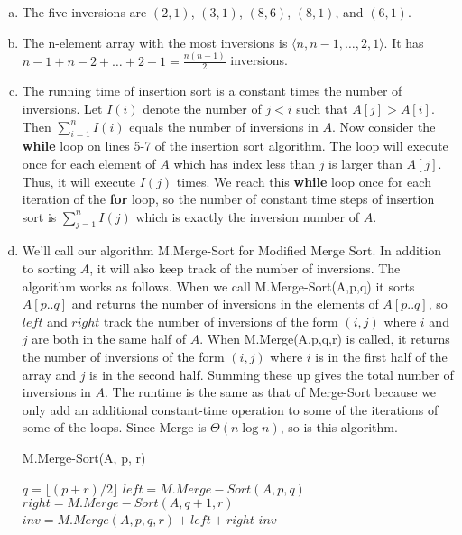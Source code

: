 \documentclass{article}
\begin{document}
\begin{enumerate}[a.]
\item The five inversions are $(2,1)$, $(3,1)$, $(8,6)$, $(8,1)$, and $(6,1)$. \\

\item The n-element array with the most inversions is $\langle n, n-1, \ldots, 2, 1 \rangle$.  It has $n-1 + n-2 + \ldots + 2 + 1 = \frac{n(n-1)}{2}$ inversions. \\

\item The running time of insertion sort is a constant times the number of inversions.  Let $I(i)$ denote the number of $j < i$ such that $A[j] > A[i]$.  Then $\sum_{i=1}^n I(i)$ equals the number of inversions in $A$.  Now consider the \textbf{while} loop on lines 5-7 of the insertion sort algorithm.  The loop will execute once for each element of $A$ which has index less than $j$ is larger than $A[j]$.  Thus, it will execute $I(j)$ times.  We reach this \textbf{while} loop once for each iteration of the \textbf{for} loop, so the number of constant time steps of insertion sort is $\sum_{j=1}^n I(j)$ which is exactly the inversion number of $A$.  \\

\item We'll call our algorithm M.Merge-Sort for Modified Merge Sort.  In addition to sorting $A$, it will also keep track of the number of inversions.  The algorithm works as follows.  When we call M.Merge-Sort(A,p,q) it sorts $A[p..q]$ and returns the number of inversions in the elements of $A[p..q]$, so $left$ and $right$ track the number of inversions of the form $(i,j)$ where $i$ and $j$ are both in the same half of $A$.  When M.Merge(A,p,q,r) is called, it returns the number of inversions of the form $(i,j)$ where $i$ is in the first half of the array and $j$ is in the second half.  Summing these up gives the total number of inversions in $A$.  The runtime is the same as that of Merge-Sort because we only add an additional constant-time operation to some of the iterations of some of the loops.  Since Merge is $\Theta(n \log n)$, so is this algorithm.

\begin{algorithm}
\caption{M.Merge-Sort(A, p, r)}
\begin{algorithmic}
	\State $q = \lfloor(p+r)/2\rfloor$
	\State $left = M.Merge-Sort(A,p,q)$
	\State $right = M.Merge-Sort(A,q+1,r)$
	\State $inv = M.Merge(A,p,q,r) + left + right$
	\State \Return $inv$
\EndIf
\State {}
\end{algorithmic}
\end{algorithm}


\end{enumerate}
\end{document}
